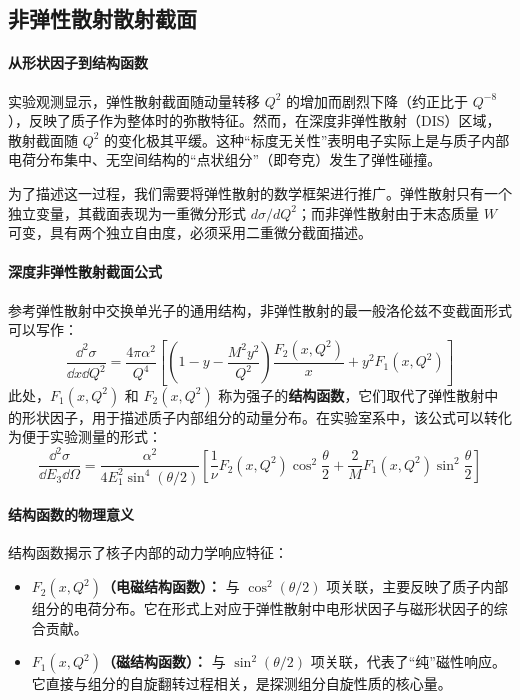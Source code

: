 \subsection{非弹性散射散射截面}

\paragraph{从形状因子到结构函数}

实验观测显示，弹性散射截面随动量转移 $Q^2$ 的增加而剧烈下降（约正比于 $Q^{-8}$），反映了质子作为整体时的弥散特征。然而，在深度非弹性散射（DIS）区域，散射截面随 $Q^2$ 的变化极其平缓。这种“标度无关性”表明电子实际上是与质子内部电荷分布集中、无空间结构的“点状组分”（即夸克）发生了弹性碰撞。

为了描述这一过程，我们需要将弹性散射的数学框架进行推广。弹性散射只有一个独立变量，其截面表现为一重微分形式 $d\sigma/dQ^2$；而非弹性散射由于末态质量 $W$ 可变，具有两个独立自由度，必须采用二重微分截面描述。

\paragraph{深度非弹性散射截面公式}

参考弹性散射中交换单光子的通用结构，非弹性散射的最一般洛伦兹不变截面形式可以写作：
\begin{equation}
    \frac{\dd^2\sigma}{\dd x \dd Q^2} = \frac{4\pi\alpha^2}{Q^4} \left[ \left(1 - y - \frac{M^2y^2}{Q^2}\right) \frac{F_2(x, Q^2)}{x} + y^2 F_1(x, Q^2) \right]
\end{equation}
此处，$F_1(x, Q^2)$ 和 $F_2(x, Q^2)$ 称为强子的\textbf{结构函数}，它们取代了弹性散射中的形状因子，用于描述质子内部组分的动量分布。在实验室系中，该公式可以转化为便于实验测量的形式：
\begin{equation}
    \frac{\dd^2\sigma}{\dd E_3 \dd\Omega} = \frac{\alpha^2}{4E_1^2 \sin^4(\theta/2)} \left[ \frac{1}{\nu} F_2(x, Q^2) \cos^2\frac{\theta}{2} + \frac{2}{M} F_1(x, Q^2) \sin^2\frac{\theta}{2} \right]
\end{equation}

\paragraph{结构函数的物理意义}

结构函数揭示了核子内部的动力学响应特征：
\begin{itemize}
    \item \textbf{$F_2(x, Q^2)$（电磁结构函数）：} 与 $\cos^2(\theta/2)$ 项关联，主要反映了质子内部组分的电荷分布。它在形式上对应于弹性散射中电形状因子与磁形状因子的综合贡献。
    \item \textbf{$F_1(x, Q^2)$（磁结构函数）：} 与 $\sin^2(\theta/2)$ 项关联，代表了“纯”磁性响应。它直接与组分的自旋翻转过程相关，是探测组分自旋性质的核心量。
\end{itemize}


